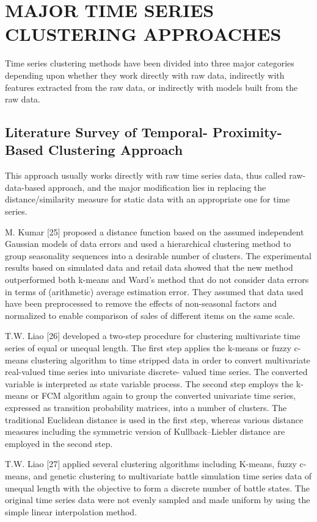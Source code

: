 \section{MAJOR TIME SERIES CLUSTERING APPROACHES}

Time series clustering methods have been divided into three
major categories depending upon whether they work directly with raw data, indirectly with features extracted from the raw data, or indirectly with models built from the raw data.

\subsection{ Literature    Survey    of    Temporal- Proximity-Based Clustering Approach }
This approach usually works directly with  raw time  series data,  thus  called  raw-data-based  approach,  and  the  major
modification lies in replacing the distance/similarity measure
for static data with an appropriate one for time series.

M. Kumar [25] proposed a distance function based on the assumed independent Gaussian models of data errors and used a   hierarchical   clustering   method   to   group   seasonality sequences into a desirable number of clusters. The experimental results based on simulated data and retail data showed that the new method outperformed both k-means and Ward’s method that do not consider data errors in terms of (arithmetic) average estimation error. They assumed that data used have been preprocessed to remove the effects of non-seasonal factors and normalized to enable comparison of sales of different items on the same scale.

T.W. Liao [26] developed a two-step procedure for clustering multivariate time series of equal or unequal length. The first step   applies   the   k-means   or   fuzzy   c-means   clustering algorithm   to   time   stripped   data   in   order   to   convert multivariate real-valued time series into univariate discrete- valued time series. The converted variable is interpreted as state variable process. The second step employs the k-means or FCM algorithm again to group the converted univariate time series, expressed as transition probability matrices, into a number of clusters. The traditional Euclidean distance is used in the first step, whereas various distance measures including the symmetric version of Kullback–Liebler distance are employed in the second step.

T.W.   Liao   [27]   applied   several   clustering   algorithms including K-means, fuzzy c-means, and genetic clustering to multivariate  battle  simulation  time  series  data  of  unequal length with the objective to form a discrete number of battle states. The original time series data were not evenly sampled and made uniform by using the simple linear interpolation method.

